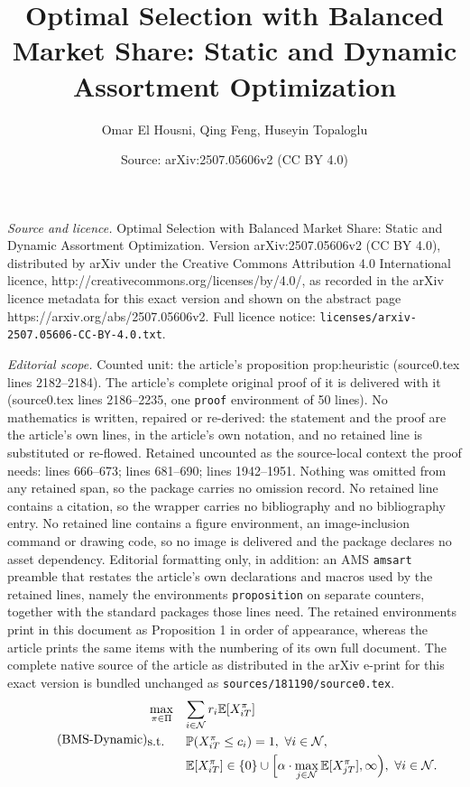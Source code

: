\documentclass[10pt,a4paper]{amsart}
\title{Optimal Selection with Balanced Market Share: Static and Dynamic Assortment Optimization}
\author{Omar El Housni, Qing Feng, Huseyin Topaloglu}
\date{Source: arXiv:2507.05606v2 (CC BY 4.0)}
\begin{document}
\maketitle

\noindent\emph{Source and licence.} Optimal Selection with Balanced Market Share: Static and Dynamic Assortment Optimization. Version arXiv:2507.05606v2 (CC BY 4.0), distributed by arXiv under the Creative Commons Attribution 4.0 International licence, http://creativecommons.org/licenses/by/4.0/, as recorded in the arXiv licence metadata for this exact version and shown on the abstract page https://arxiv.org/abs/2507.05606v2. Full licence notice: \texttt{licenses/arxiv-2507.05606-CC-BY-4.0.txt}.\par\smallskip

\noindent\textit{Editorial scope.} Counted unit: the article's proposition prop:heuristic (source0.tex lines 2182--2184). The article's complete original proof of it is delivered with it (source0.tex lines 2186--2235, one \texttt{proof} environment of 50 lines). No mathematics is written, repaired or re-derived: the statement and the proof are the article's own lines, in the article's own notation, and no retained line is substituted or re-flowed.  Retained uncounted as the source-local context the proof needs: lines 666--673; lines 681--690; lines 1942--1951.  Nothing was omitted from any retained span, so the package carries no omission record.  No retained line contains a citation, so the wrapper carries no bibliography and no bibliography entry.  No retained line contains a figure environment, an image-inclusion command or drawing code, so no image is delivered and the package declares no asset dependency.  Editorial formatting only, in addition: an AMS \texttt{amsart} preamble that restates the article's own declarations and macros used by the retained lines, namely the environments \texttt{proposition} on separate counters, together with the standard packages those lines need.  The retained environments print in this document as Proposition 1 in order of appearance, whereas the article prints the same items with the numbering of its own full document.  The complete native source of the article as distributed in the arXiv e-print for this exact version is bundled unchanged as \texttt{sources/181190/source0.tex}.
\begin{equation}\label{prob:inventory}
\tag{\texttt{BMS-Dynamic}}
\begin{aligned}
&\max_{\pi\in\Pi}&&{\sum_{i\in\mathcal{N}}r_i\mathbb{E}[X_{iT}^\pi]}\\
&\text{s.t.}&&{\mathbb{P}(X_{iT}^\pi\leq c_i)=1,\ \forall i\in\mathcal{N},}\\
&&&{\mathbb{E}[X_{iT}^\pi]\in\{0\}\cup \Big[\alpha\cdot \max_{j\in\mathcal{N}}\mathbb{E}[X_{jT}^\pi],\infty\Big),\ \forall i\in\mathcal{N}.}
\end{aligned}
\end{equation}
\end{document}
